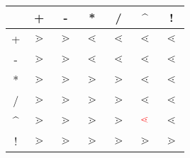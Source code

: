 \begin{tabular}{c | c c c c c c}
	 & + & - & * & / & \^{} & ! \\
	\hline
	+ & $\gtrdot{}$ & $\gtrdot{}$ & $\lessdot{}$ & $\lessdot{}$ & $\lessdot{}$ & $\lessdot{}$ \\
	- & $\gtrdot{}$ & $\gtrdot{}$ & $\lessdot{}$ & $\lessdot{}$ & $\lessdot{}$ & $\lessdot{}$ \\
	* & $\gtrdot{}$ & $\gtrdot{}$ & $\gtrdot{}$ & $\gtrdot{}$ & $\lessdot{}$ & $\lessdot{}$ \\
	/ & $\gtrdot{}$ & $\gtrdot{}$ & $\gtrdot{}$ & $\gtrdot{}$ & $\lessdot{}$ & $\lessdot{}$ \\
	\^{} & $\gtrdot{}$ & $\gtrdot{}$ & $\gtrdot{}$ & $\gtrdot{}$ & $\textcolor{red}{\lessdot{}}$ & $\lessdot{}$ \\
	! & $\gtrdot{}$ & $\gtrdot{}$ & $\gtrdot{}$ & $\gtrdot{}$ & $\gtrdot{}$ & $\gtrdot{}$
\end{tabular}